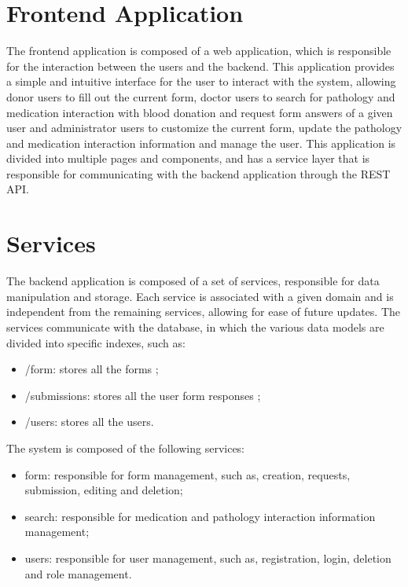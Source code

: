 \section{Frontend Application}

The frontend application is composed of a web application, which is responsible for the interaction between the users and the backend. This application provides a simple and intuitive interface for the user to interact with the system, allowing donor users to fill out the current form, doctor users to search for pathology and medication interaction with blood donation and request form answers of a given user and administrator users to customize the current form, update the pathology and medication interaction information and manage the user.
This application is divided into multiple pages and components, and has a service
layer that is responsible for communicating with the backend application through the
REST API.

\section{Services}

The backend application is composed of a set of services, responsible for data manipulation and storage. Each service is associated with a given domain and is independent from the remaining services, allowing for ease of future updates.
The services communicate with the database, in which the various data models are divided into specific indexes, such as:

\begin{itemize}
	\item /form: stores all the forms ;
	\item /submissions: stores all the user form responses ;
	\item /users: stores all the users.
\end{itemize}

The system is composed of the following services:

\begin{itemize}
	\item form: responsible for form management, such as, creation, requests, submission, editing and deletion;
	\item search: responsible for medication and pathology interaction information management;
	\item users: responsible for user management, such as, registration, login, deletion and role management.
\end{itemize}


